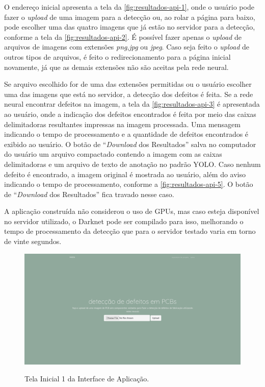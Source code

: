 \begin{figure}[H]
  \label{fig:resultados-api-etapas}
\end{figure}

O endereço inicial apresenta a tela da \autoref{fig:resultados-api-1}, onde o usuário pode fazer o \textit{upload} de uma imagem para a detecção ou, ao rolar a página para baixo, pode escolher uma das quatro imagens que já estão no servidor para a detecção, conforme a tela da \autoref{fig:resultados-api-2}. É possível fazer apenas o \textit{upload} de arquivos de imagens com extensões \textit{png},\textit{jpg} ou \textit{jpeg}. Caso seja feito o \textit{upload} de outros tipos de arquivos, é feito o redirecionamento para a página inicial novamente, já que as demais extensões não são aceitas pela rede neural.

Se arquivo escolhido for de uma das extensões permitidas ou o usuário escolher uma das imagens que está no servidor, a detecção dos defeitos é feita. Se a rede neural encontrar defeitos na imagem, a tela da \autoref{fig:resultados-api-3} é apresentada ao usuário, onde a indicação dos defeitos encontrados é feita por meio das caixas delimitadoras resultantes impressas na imagem processada. Uma mensagem indicando o tempo de processamento e a quantidade de defeitos encontrados é exibido ao usuário. O botão de ``\textit{Download} dos Resultados'' salva no computador do usuário um arquivo compactado contendo a imagem com as caixas delimitadoras e um arquivo de texto de anotação no padrão YOLO. Caso nenhum defeito é encontrado, a imagem original é mostrada ao usuário, além do aviso indicando o tempo de processamento, conforme a \autoref{fig:resultados-api-5}. O botão de ``\textit{Download} dos Resultados'' fica travado nesse caso.

A aplicação construída não considerou o uso de GPUs, mas caso esteja disponível no servidor utilizado, o Darknet pode ser compilado para isso, melhorando o tempo de processamento da detecção que para o servidor testado varia em torno de vinte segundos.

\begin{landscape}
  \begin{figure}[H] %
    \centering
    \caption{Tela Inicial 1 da Interface de Aplicação.}
    \includegraphics[scale=0.36]{img/api/1.png}
    \label{fig:resultados-api-1}
  \end{figure}
\end{landscape}

